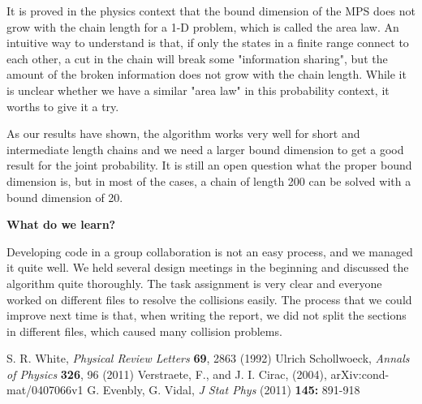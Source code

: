 \documentclass[english]{article}
\begin{document}
It is proved in the physics context that the bound dimension of the MPS does not grow with the chain length for a 1-D problem, which is called the area law. An intuitive way to understand is that, if only the states in a finite range connect to each other, a cut in the chain will break some "information sharing", but the amount of the broken information does not grow with the chain length. While it is unclear whether we have a similar "area law" in this probability context, it worths to give it a try.

As our results have shown, the algorithm works very well for short and intermediate length chains and we need a larger bound dimension to get a good result for the joint probability. It is still an open question what the proper bound dimension is, but in most of the cases, a chain of length 200 can be solved with a bound dimension of 20.

\noindent \textbf{What do we learn?}

Developing code in a group collaboration is not an easy process, and we managed it quite well. We held several design meetings in the beginning and discussed the algorithm quite thoroughly. The task assignment is very clear and everyone worked on different files to resolve the collisions easily. The process that we could improve next time is that, when writing the report, we did not split the sections in different files, which caused many collision problems.

\begin{thebibliography}{99}
 S. R. White, {\it Physical Review Letters} {\bf 69}, 2863 (1992)
 Ulrich Schollwoeck, {\it Annals of Physics} {\bf 326}, 96 (2011)
 Verstraete, F., and J. I. Cirac, (2004), arXiv:cond-mat/0407066v1
G. Evenbly, G. Vidal, {\it J Stat Phys} (2011) {\bf 145:} 891-918
\end{thebibliography}
\end{document}
